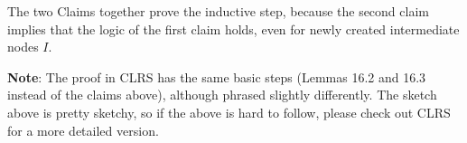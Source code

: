 \documentclass [12pt]{article}
\theoremstyle{definition}
\begin{document}
The two Claims together prove the inductive step, because the second claim implies that the logic of the first claim holds, even for newly created intermediate nodes $I$.

\textbf{Note}: The proof in CLRS has the same basic steps (Lemmas 16.2 and 16.3 instead of the claims above), although phrased slightly differently. The sketch above is pretty sketchy, so if the above is hard to follow, please check out CLRS for a more detailed version.
\end{document}
